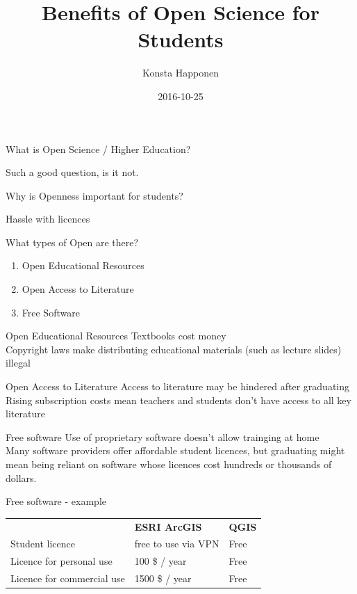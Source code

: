 \documentclass{beamer}
\title{Benefits of Open Science for Students}
\author{Konsta Happonen}
\institute{Open Knowledge Finland}
\date{2016-10-25}
\begin{document}
\maketitle


\begin{frame}{What is Open Science / Higher Education?}

  Such a good question, is it not.

\end{frame}

\begin{frame}{Why is Openness important for students?}

  Hassle with licences

\end{frame}

\begin{frame}{What types of Open are there?}
  \begin{enumerate}
  \item Open Educational Resources
  \item Open Access to Literature
  \item Free Software
  \end{enumerate}
\end{frame}

\begin{frame}{Open Educational Resources}
  Textbooks cost money\\
  Copyright laws make distributing educational materials (such as lecture slides) illegal
\end{frame}

\begin{frame}{Open Access to Literature}
  Access to literature may be hindered after graduating\\
  Rising subscription costs mean teachers and students don't have access to all key literature
\end{frame}

\begin{frame}{Free software}
  Use of proprietary software doesn't allow trainging at home\\
  Many software providers offer affordable student licences, but graduating might mean being reliant on software whose licences cost hundreds or thousands of dollars.\\
\end{frame}

\begin{frame}{Free software - example}
  \begin{tabularx}{\textwidth}{lXl}
     & \textbf{ESRI ArcGIS} & \textbf{QGIS}\\
    Student licence & free to use via VPN & Free\\
    Licence for personal use & 100 \$ / year & Free\\
    Licence for commercial use & 1500 \$ / year & Free
  \end{tabularx}
\end{frame}
\end{document}
